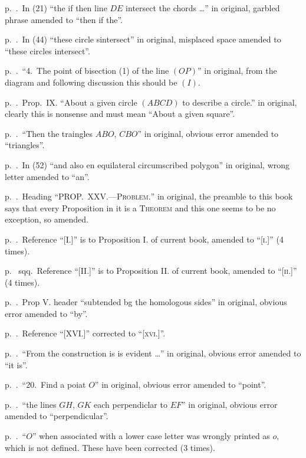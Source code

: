 \documentclass[oneside]{book}
\begin{document}
p.~\pageref{theifthen}.~In (21) ``the if then line $DE$ intersect the chords \ldots'' in original,
garbled phrase amended to ``then if the''.

p.~\pageref{circlesin}.~In (44) ``these circle sintersect'' in original,
misplaced space amended to ``these circles intersect''.

p.~\pageref{bisection1}.~``4.~The point of bisection (1) of the line $(OP)$'' in original,
from the diagram and following discussion this should be $(I)$.

p.~\pageref{circlesquare}.~Prop.~IX\@. ``About a given circle $(ABCD)$ to describe a circle.'' in original,
clearly this is nonsense and must mean ``About a given square''.

p.~\pageref{traingles}.~``Then the traingles $ABO$, $CBO$'' in original,
obvious error amended to ``triangles''.

p.~\pageref{enforan}.~In (52) ``and also en equilateral circumscribed polygon'' in original,
wrong letter amended to ``an''.

p.~\pageref{NoProblem}.~Heading ``\textsc{PROP\@.~XXV\@.---Problem.}'' in original,
the preamble to this book says that every Proposition in it is a \textsc{Theorem} and this
one seems to be no exception, so amended.\

p.~\pageref{VIi}.~Reference ``[I.]'' is to Proposition I. of current book, amended to ``\textsc{[i.]}''
(4 times).

p.~\pageref{VIii} sqq.~Reference ``[II\@.]'' is to Proposition II\@. of current book, amended to ``\textsc{[ii.]}''
(4 times).

p.~\pageref{bg}.~Prop V. header ``subtended bg the homologous sides'' in original,
obvious error amended to ``by''.

p.~\pageref{XVI}.~Reference ``[XVI\@.]'' corrected to ``[\textsc{xvi.}]''.

p.~\pageref{isis}.~``From the construction is is evident \ldots'' in original,
obvious error amended to ``it is''.

p.~\pageref{poiat}.~``20.~Find a poiat $O$'' in original,
obvious error amended to ``point''.

p.~\pageref{perpendiclar}.~``the lines $GH$, $GK$ each perpendiclar to $EF$'' in original,
obvious error amended to ``perpendicular''.

p.~\pageref{wrongo}.~``$O$'' when associated with a lower case letter was wrongly printed as $o$, which
is not defined. These have been corrected (3 times).
\end{document}
